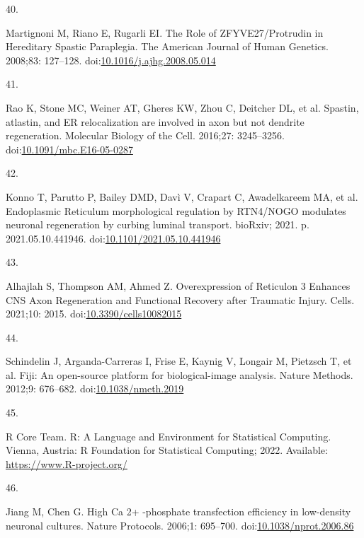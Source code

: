 \documentclass[
  12pt,
  a4paper,
]{book}
\newlength{\cslhangindent}
\newlength{\csllabelwidth}
\newlength{\cslentryspacingunit} %
\newenvironment{CSLReferences}[2] %
 {%
  \setlength{\parindent}{0pt}
  \ifodd #1
  \let\oldpar\par
  \def\par{\hangindent=\cslhangindent\oldpar}
  \fi
  \setlength{\parskip}{#2\cslentryspacingunit}
 }%
 {}
\newcommand{\CSLLeftMargin}[1]{\parbox[t]{\csllabelwidth}{#1}}
\newcommand{\CSLRightInline}[1]{\parbox[t]{\linewidth - \csllabelwidth}{#1}\break}
\begin{document}
\begin{CSLReferences}{0}{0}
\leavevmode{}%
\CSLLeftMargin{40. }%
\CSLRightInline{Martignoni M, Riano E, Rugarli EI. The {Role} of {ZFYVE27}/{Protrudin} in {Hereditary Spastic Paraplegia}. The American Journal of Human Genetics. 2008;83: 127--128. doi:\href{https://doi.org/10.1016/j.ajhg.2008.05.014}{10.1016/j.ajhg.2008.05.014}}

\leavevmode{}%
\CSLLeftMargin{41. }%
\CSLRightInline{Rao K, Stone MC, Weiner AT, Gheres KW, Zhou C, Deitcher DL, et al. Spastin, atlastin, and {ER} relocalization are involved in axon but not dendrite regeneration. Molecular Biology of the Cell. 2016;27: 3245--3256. doi:\href{https://doi.org/10.1091/mbc.E16-05-0287}{10.1091/mbc.E16-05-0287}}

\leavevmode{}%
\CSLLeftMargin{42. }%
\CSLRightInline{Konno T, Parutto P, Bailey DMD, Davì V, Crapart C, Awadelkareem MA, et al. Endoplasmic {Reticulum} morphological regulation by {RTN4}/{NOGO} modulates neuronal regeneration by curbing luminal transport. {bioRxiv}; 2021. p. 2021.05.10.441946. doi:\href{https://doi.org/10.1101/2021.05.10.441946}{10.1101/2021.05.10.441946}}

\leavevmode{}%
\CSLLeftMargin{43. }%
\CSLRightInline{Alhajlah S, Thompson AM, Ahmed Z. Overexpression of {Reticulon} 3 {Enhances CNS Axon Regeneration} and {Functional Recovery} after {Traumatic Injury}. Cells. 2021;10: 2015. doi:\href{https://doi.org/10.3390/cells10082015}{10.3390/cells10082015}}

\leavevmode{}%
\CSLLeftMargin{44. }%
\CSLRightInline{Schindelin J, Arganda-Carreras I, Frise E, Kaynig V, Longair M, Pietzsch T, et al. Fiji: An open-source platform for biological-image analysis. Nature Methods. 2012;9: 676--682. doi:\href{https://doi.org/10.1038/nmeth.2019}{10.1038/nmeth.2019}}

\leavevmode{}%
\CSLLeftMargin{45. }%
\CSLRightInline{R Core Team. R: {A Language} and {Environment} for {Statistical Computing}. {Vienna, Austria}: {R Foundation for Statistical Computing}; 2022. Available: \url{https://www.R-project.org/}}

\leavevmode{}%
\CSLLeftMargin{46. }%
\CSLRightInline{Jiang M, Chen G. High {Ca} 2+ -phosphate transfection efficiency in low-density neuronal cultures. Nature Protocols. 2006;1: 695--700. doi:\href{https://doi.org/10.1038/nprot.2006.86}{10.1038/nprot.2006.86}}


\end{CSLReferences}
\end{document}
